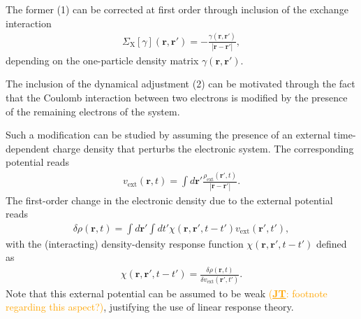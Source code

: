 \documentclass[aip,jcp,reprint,noshowkeys,superscriptaddress]{revtex4-2}
\newcommand{\jt}[1]{\textcolor{orange}{#1}}
\newcommand{\JT}[1]{\jt{(\underline{\bf JT}: #1)}}
\begin{document}
The former (1) can be corrected at first order through inclusion of the exchange interaction
\begin{align}
    \Sigma_\mathrm{X}[\gamma](\mathbf{r},\mathbf{r}') = - \frac{\gamma(\mathbf{r},\mathbf{r}')}{|\mathbf{r} - \mathbf{r}'|},
\end{align}
depending on the one-particle density matrix $\gamma(\mathbf{r},\mathbf{r}')$.

The inclusion of the dynamical adjustment (2) can be motivated through the fact that the Coulomb interaction between two electrons is modified by the presence of the remaining electrons of the system. 

Such a modification can be studied by assuming the presence of an external time-dependent charge density that perturbs the electronic system.
The corresponding potential reads
\begin{align}
    v_\mathrm{ext}(\mathbf{r},t) = \int d\mathbf{r}' \frac{\rho_\mathrm{ext}(\mathbf{r}', t)}{|\mathbf{r} - \mathbf{r}'|}.
    \label{eq:ExtPot}
\end{align}
The first-order change in the electronic density due to the external potential reads
\begin{align}
    \delta \rho(\mathbf{r}, t) = \int d\mathbf{r}' \int dt' \chi(\mathbf{r},\mathbf{r}', t-t') v_\mathrm{ext}(\mathbf{r}', t'),
\end{align}
with the (interacting) density-density response function $\chi(\mathbf{r},\mathbf{r}', t-t')$ defined as
\begin{align}
    \chi(\mathbf{r},\mathbf{r}', t-t') = \frac{\delta \rho(\mathbf{r}, t)}{\delta v_\mathrm{ext}(\mathbf{r}', t')}.
\end{align}
Note that this external potential can be assumed to be weak \JT{footnote regarding this aspect?}, justifying the use of linear response theory.
\end{document}
